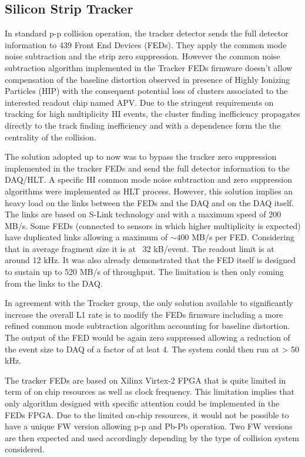 \subsection{Silicon Strip Tracker\label{subsec:SiTracker}}
In standard p-p collision operation, the tracker detector sends the full detector information to 439 Front End Devices (FEDs). They apply the common mode noise subtraction and the strip zero suppression. However the common noise subtraction algorithm implemented in the Tracker FEDs firmware doesn’t allow compensation of the baseline distortion observed in presence of Highly Ionizing Particles (HIP) with the consequent potential loss of clusters associated to the interested readout chip named APV. Due to the stringent requirements on tracking for high multiplicity HI events, the cluster finding inefficiency propagates directly to the track finding inefficiency and with a dependence form the the centrality of the collision.  

The solution adopted up to now was to bypass the tracker zero suppression implemented in the tracker FEDs and send the full detector information to the DAQ/HLT. A specific HI common mode noise subtraction and zero suppression algorithms were implemented as HLT process. However, this solution implies an heavy load on the links between the FEDs and the DAQ and on the DAQ itself. The links are based on S-Link technology and with a maximum speed of 200 MB/s. Some FEDs (connected to sensors in which higher multiplicity is expected) have duplicated links allowing a maximum of $\sim 400$ MB/s per FED.  Considering that in average fragment size it is at ~32 kB/event. The readout limit is at around 12 kHz. It was also already demonstrated that the FED itself is designed to sustain up to 520 MB/s of throughput. The limitation is then only coming from the links to the DAQ. 

In agreement with the Tracker group, the only solution available to significantly increase the overall L1 rate is to modify the FEDs firmware including a more refined common mode subtraction algorithm accounting for baseline distortion. The output of the FED would be again zero suppressed allowing a reduction of the event size to DAQ of a factor of at leat 4. The system could then run at > 50 kHz. 

The tracker FEDs are based on Xilinx Virtex-2 FPGA that is quite limited in term of on chip resources as well as clock frequency. This limitation implies that only algorithm designed with specific attention could be implemented in the FEDs FPGA. Due to the  limited on-chip resources, it would not be possible to have a unique FW version allowing p-p and Pb-Pb operation. Two FW versions are then expected and used accordingly depending by the type of collision system considered. 

